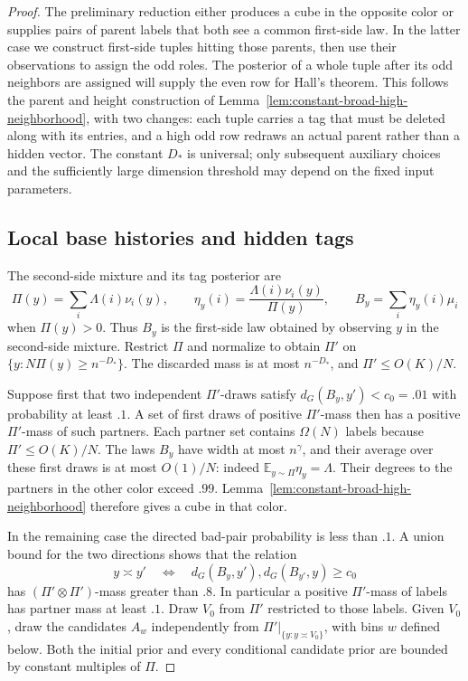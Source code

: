 \begin{proof}
The preliminary reduction either produces a cube in the opposite color
or supplies pairs of parent labels that both see a common first-side law.
In the latter case we construct first-side tuples hitting those parents,
then use their observations to assign the odd roles. The posterior of a
whole tuple after its odd neighbors are assigned will supply the even
row for Hall's theorem. This follows the parent and height construction
of Lemma~\ref{lem:constant-broad-high-neighborhood}, with two changes:
each tuple carries a tag that must be deleted along with its entries,
and a high odd row redraws an actual parent rather than a hidden vector.
The constant \(D_*\) is universal; only subsequent auxiliary choices
and the sufficiently large dimension threshold may depend on the fixed
input parameters.

\subsection{Local base histories and hidden tags}
\label{sec:local-base-histories-and-hidden-tags}

The second-side mixture and its tag posterior are
\[
 \Pi(y)=\sum_i\Lambda(i)\nu_i(y),\qquad
 \eta_y(i)=\frac{\Lambda(i)\nu_i(y)}{\Pi(y)},\qquad
 B_y=\sum_i\eta_y(i)\mu_i
\]
when \(\Pi(y)>0\). Thus \(B_y\) is the first-side law obtained by
observing \(y\) in the second-side mixture. Restrict \(\Pi\) and normalize
to obtain \(\Pi'\) on \(\{y:N\Pi(y)\ge n^{-D_*}\}\). The discarded mass
is at most \(n^{-D_*}\), and \(\Pi'\le O(K)/N\).

Suppose first that two independent \(\Pi'\)-draws satisfy
\(d_G(B_y,y')<c_0=.01\) with probability at least \(.1\).
A set of first draws of positive \(\Pi'\)-mass then has a positive
\(\Pi'\)-mass of such partners. Each partner set contains \(\Omega(N)\)
labels because \(\Pi'\le O(K)/N\). The laws \(B_y\) have width at most
\(n^\gamma\), and their average over these first draws is at most
\(O(1)/N\): indeed \(\mathbb E_{y\sim\Pi}\eta_y=\Lambda\).
Their degrees to the partners in the other color exceed \(.99\).
Lemma~\ref{lem:constant-broad-high-neighborhood} therefore gives a cube
in that color.

In the remaining case the directed bad-pair probability is less than
\(.1\). A union bound for the two directions shows that the relation
\[
 y\asymp y'\quad\Longleftrightarrow\quad
 d_G(B_y,y'),d_G(B_{y'},y)\ge c_0
\]
has \((\Pi'\otimes\Pi')\)-mass greater than \(.8\). In particular a
positive \(\Pi'\)-mass of labels has partner mass at least \(.1\).
Draw \(V_0\) from \(\Pi'\) restricted to those labels. Given \(V_0\),
draw the candidates \(A_w\) independently from
\(\Pi'|_{\{y:y\asymp V_0\}}\), with bins \(w\) defined below.
Both the initial prior and every conditional candidate prior are bounded
by constant multiples of \(\Pi\).


\end{proof}
